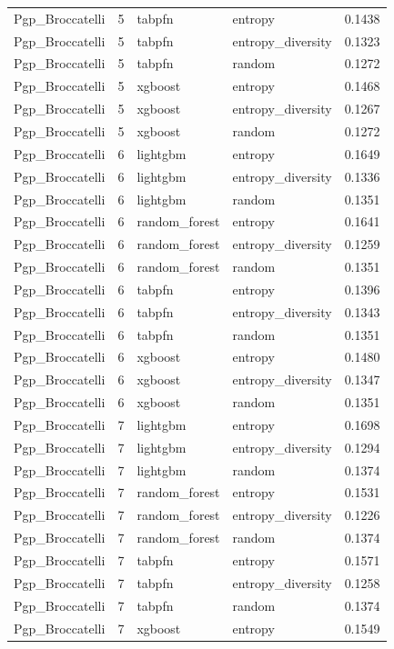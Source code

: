 \begin{tabular}{lrllr}
Pgp_Broccatelli & 5 & tabpfn & entropy & 0.1438 \\
Pgp_Broccatelli & 5 & tabpfn & entropy_diversity & 0.1323 \\
Pgp_Broccatelli & 5 & tabpfn & random & 0.1272 \\
Pgp_Broccatelli & 5 & xgboost & entropy & 0.1468 \\
Pgp_Broccatelli & 5 & xgboost & entropy_diversity & 0.1267 \\
Pgp_Broccatelli & 5 & xgboost & random & 0.1272 \\
Pgp_Broccatelli & 6 & lightgbm & entropy & 0.1649 \\
Pgp_Broccatelli & 6 & lightgbm & entropy_diversity & 0.1336 \\
Pgp_Broccatelli & 6 & lightgbm & random & 0.1351 \\
Pgp_Broccatelli & 6 & random_forest & entropy & 0.1641 \\
Pgp_Broccatelli & 6 & random_forest & entropy_diversity & 0.1259 \\
Pgp_Broccatelli & 6 & random_forest & random & 0.1351 \\
Pgp_Broccatelli & 6 & tabpfn & entropy & 0.1396 \\
Pgp_Broccatelli & 6 & tabpfn & entropy_diversity & 0.1343 \\
Pgp_Broccatelli & 6 & tabpfn & random & 0.1351 \\
Pgp_Broccatelli & 6 & xgboost & entropy & 0.1480 \\
Pgp_Broccatelli & 6 & xgboost & entropy_diversity & 0.1347 \\
Pgp_Broccatelli & 6 & xgboost & random & 0.1351 \\
Pgp_Broccatelli & 7 & lightgbm & entropy & 0.1698 \\
Pgp_Broccatelli & 7 & lightgbm & entropy_diversity & 0.1294 \\
Pgp_Broccatelli & 7 & lightgbm & random & 0.1374 \\
Pgp_Broccatelli & 7 & random_forest & entropy & 0.1531 \\
Pgp_Broccatelli & 7 & random_forest & entropy_diversity & 0.1226 \\
Pgp_Broccatelli & 7 & random_forest & random & 0.1374 \\
Pgp_Broccatelli & 7 & tabpfn & entropy & 0.1571 \\
Pgp_Broccatelli & 7 & tabpfn & entropy_diversity & 0.1258 \\
Pgp_Broccatelli & 7 & tabpfn & random & 0.1374 \\
Pgp_Broccatelli & 7 & xgboost & entropy & 0.1549 \\

\end{tabular}
